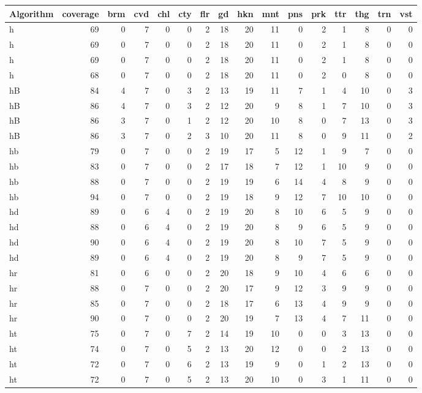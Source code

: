 \begin{center}
\begin{tabular}{lrrrrrrrrrrrrrrr}
Algorithm & coverage & brm & cvd & chl & cty & flr & gd & hkn & mnt & pns & prk & ttr & thg & trn & vst\\
\hline
h & 69 & 0 & 7 & 0 & 0 & 2 & 18 & 20 & 11 & 0 & 2 & 1 & 8 & 0 & 0\\
h & 69 & 0 & 7 & 0 & 0 & 2 & 18 & 20 & 11 & 0 & 2 & 1 & 8 & 0 & 0\\
h & 69 & 0 & 7 & 0 & 0 & 2 & 18 & 20 & 11 & 0 & 2 & 1 & 8 & 0 & 0\\
h & 68 & 0 & 7 & 0 & 0 & 2 & 18 & 20 & 11 & 0 & 2 & 0 & 8 & 0 & 0\\
hB & 84 & 4 & 7 & 0 & 3 & 2 & 13 & 19 & 11 & 7 & 1 & 4 & 10 & 0 & 3\\
hB & 86 & 4 & 7 & 0 & 3 & 2 & 12 & 20 & 9 & 8 & 1 & 7 & 10 & 0 & 3\\
hB & 86 & 3 & 7 & 0 & 1 & 2 & 12 & 20 & 10 & 8 & 0 & 7 & 13 & 0 & 3\\
hB & 86 & 3 & 7 & 0 & 2 & 3 & 10 & 20 & 11 & 8 & 0 & 9 & 11 & 0 & 2\\
hb & 79 & 0 & 7 & 0 & 0 & 2 & 19 & 17 & 5 & 12 & 1 & 9 & 7 & 0 & 0\\
hb & 83 & 0 & 7 & 0 & 0 & 2 & 17 & 18 & 7 & 12 & 1 & 10 & 9 & 0 & 0\\
hb & 88 & 0 & 7 & 0 & 0 & 2 & 19 & 19 & 6 & 14 & 4 & 8 & 9 & 0 & 0\\
hb & 94 & 0 & 7 & 0 & 0 & 2 & 19 & 18 & 9 & 12 & 7 & 10 & 10 & 0 & 0\\
hd & 89 & 0 & 6 & 4 & 0 & 2 & 19 & 20 & 8 & 10 & 6 & 5 & 9 & 0 & 0\\
hd & 88 & 0 & 6 & 4 & 0 & 2 & 19 & 20 & 8 & 9 & 6 & 5 & 9 & 0 & 0\\
hd & 90 & 0 & 6 & 4 & 0 & 2 & 19 & 20 & 8 & 10 & 7 & 5 & 9 & 0 & 0\\
hd & 89 & 0 & 6 & 4 & 0 & 2 & 19 & 20 & 8 & 9 & 7 & 5 & 9 & 0 & 0\\
hr & 81 & 0 & 6 & 0 & 0 & 2 & 20 & 18 & 9 & 10 & 4 & 6 & 6 & 0 & 0\\
hr & 88 & 0 & 7 & 0 & 0 & 2 & 20 & 17 & 9 & 12 & 3 & 9 & 9 & 0 & 0\\
hr & 85 & 0 & 7 & 0 & 0 & 2 & 18 & 17 & 6 & 13 & 4 & 9 & 9 & 0 & 0\\
hr & 90 & 0 & 7 & 0 & 0 & 2 & 20 & 19 & 7 & 13 & 4 & 7 & 11 & 0 & 0\\
ht & 75 & 0 & 7 & 0 & 7 & 2 & 14 & 19 & 10 & 0 & 0 & 3 & 13 & 0 & 0\\
ht & 74 & 0 & 7 & 0 & 5 & 2 & 13 & 20 & 12 & 0 & 0 & 2 & 13 & 0 & 0\\
ht & 72 & 0 & 7 & 0 & 6 & 2 & 13 & 19 & 9 & 0 & 1 & 2 & 13 & 0 & 0\\
ht & 72 & 0 & 7 & 0 & 5 & 2 & 13 & 20 & 10 & 0 & 3 & 1 & 11 & 0 & 0\\
\end{tabular}
\end{center}

